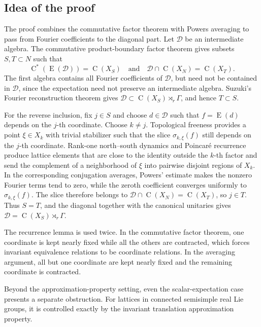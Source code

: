 \documentclass[11pt]{amsart}
\numberwithin{equation}{section}
\newcommand{\rC}{\operatorname{C}}
\newcommand{\rE}{\operatorname{E}}
\theoremstyle{definition}
\begin{document}
	\subsection*{Idea of the proof}
	The proof combines the commutative factor theorem with Powers averaging to pass
	from Fourier coefficients to the diagonal part. Let \(\mathcal D\) be an
	intermediate algebra. The commutative product-boundary factor theorem gives subsets
	\(S,T\subset N\) such that
	\[
	\rC^*(\rE(\mathcal D))=\rC(X_S)
	\quad\text{and}\quad
	\mathcal D\cap\rC(X_N)=\rC(X_T).
	\]
	The first algebra contains all Fourier coefficients of \(\mathcal D\), but need
	not be contained in \(\mathcal D\), since the expectation need not preserve an
	intermediate algebra. Suzuki's Fourier reconstruction theorem gives
	\(\mathcal D\subset\rC(X_S)\rtimes_r\Gamma\), and hence \(T\subset S\).

	For the reverse inclusion, fix \(j\in S\) and choose \(d\in\mathcal D\) such that
	\(f=\rE(d)\) depends on the \(j\)-th coordinate. Choose \(k\neq j\).
	Topological freeness provides a point \(\xi\in X_k\) with trivial stabilizer
	such that the slice \(\sigma_{k,\xi}(f)\) still depends on the \(j\)-th
	coordinate. Rank-one north--south dynamics and Poincar\'e recurrence produce
	lattice elements that are close to the identity outside the \(k\)-th factor and
	send the complement of a neighborhood of \(\xi\) into pairwise disjoint regions
	of \(X_k\). In the corresponding conjugation averages, Powers' estimate makes
	the nonzero Fourier terms tend to zero, while the zeroth coefficient converges
	uniformly to \(\sigma_{k,\xi}(f)\). The slice therefore belongs to
	\(\mathcal D\cap\rC(X_N)=\rC(X_T)\), so \(j\in T\). Thus \(S=T\), and the
	diagonal together with the canonical unitaries gives
	\(\mathcal D=\rC(X_S)\rtimes_r\Gamma\).

	The recurrence lemma is used twice. In the commutative factor theorem, one
	coordinate is kept nearly fixed while all the others are contracted, which
	forces invariant equivalence relations to be coordinate relations. In the
	averaging argument, all but one coordinate are kept nearly fixed and the
	remaining coordinate is contracted.
	
	Beyond the approximation-property setting, even the scalar-expectation case
	presents a separate obstruction. For lattices in connected semisimple real Lie
	groups, it is controlled exactly by the invariant translation approximation
	property.
	
\end{document}
